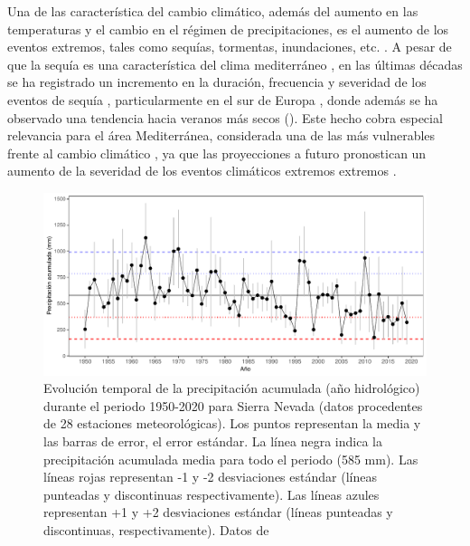 Una de las característica del cambio climático, además del aumento en las temperaturas y el cambio en el régimen de precipitaciones, es el aumento de los eventos extremos, tales como sequías, tormentas, inundaciones, etc. \autocite{IPCC2013ClimateChange}. A pesar de que la sequía es una característica del clima mediterráneo \autocites{Lionello2012}, en las últimas décadas se ha registrado un incremento en la duración, frecuencia y severidad de los eventos de sequía \autocites{LloydHughesSaunders2002DroughtClimatology, Sousaetal2011TrendsExtremes,Colletal2017DroughtVariability}, particularmente en el sur de Europa \autocites{VicenteSerranoetal2014EvidenceIncreasing,Staggeetal2017ObservedDrought,Spinonietal2015EuropeanDrought,Pascoaetal2017DroughtTrends}, donde además se ha observado una tendencia hacia veranos más secos \autocites{Spinonietal2017PanEuropeanSeasonal} (). Este hecho cobra especial relevancia para el área Mediterránea, considerada una de las más vulnerables frente al cambio climático \autocites{Giorgi2006ClimateChange}, ya que las proyecciones a futuro pronostican un aumento de la severidad de los eventos climáticos extremos extremos \autocites{Hoerlingetal2012IncreasedFrequency,IPCC2013ClimateChange,Trenberthetal2014GlobalWarming,Spinonietal2018WillDrought}.  

\begin{figure}
	\centering
	\includegraphics[width=\textwidth]{img/intro/intro-sequia.pdf} \caption{Evolución temporal de la precipitación acumulada (año hidrológico) durante el periodo 1950-2020 para Sierra Nevada (datos procedentes de 28 estaciones meteorológicas). Los puntos representan la media y las barras de error, el error estándar. La línea negra indica la precipitación acumulada media para todo el periodo (585 mm). Las líneas rojas representan -1 y -2 desviaciones estándar (líneas punteadas y discontinuas respectivamente). Las líneas azules representan +1 y +2 desviaciones estándar (líneas punteadas y discontinuas, respectivamente). Datos de \autocite{PerezLuqueetal2021ClimaNevadaBase}}\label{fig:intro:sequia}
\end{figure}

